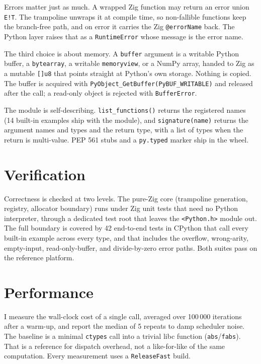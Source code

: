 \documentclass{jot}
\begin{document}
Errors matter just as much. A wrapped Zig function may return an error union \texttt{E!T}. The trampoline unwraps it at compile time, so non-fallible functions keep the branch-free path, and on error it carries the Zig \texttt{@errorName} back. The Python layer raises that as a \texttt{RuntimeError} whose message is the error name.

The third choice is about memory. A \texttt{buffer} argument is a writable Python buffer, a \texttt{bytearray}, a writable \texttt{memoryview}, or a NumPy array, handed to Zig as a mutable \texttt{[]u8} that points straight at Python's own storage. Nothing is copied. The buffer is acquired with \texttt{PyObject\_GetBuffer(PyBUF\_WRITABLE)} and released after the call; a read-only object is rejected with \texttt{BufferError}.

The module is self-describing. \texttt{list\_functions()} returns the registered names (14 built-in examples ship with the module), and \texttt{signature(name)} returns the argument names and types and the return type, with a list of types when the return is multi-value. PEP 561 stubs and a \texttt{py.typed} marker ship in the wheel.

\section{Verification}

Correctness is checked at two levels. The pure-Zig core (trampoline generation, registry, allocator boundary) runs under Zig unit tests that need no Python interpreter, through a dedicated test root that leaves the \texttt{<Python.h>} module out. The full boundary is covered by 42 end-to-end tests in CPython that call every built-in example across every type, and that includes the overflow, wrong-arity, empty-input, read-only-buffer, and divide-by-zero error paths. Both suites pass on the reference platform.

\section{Performance}

I measure the wall-clock cost of a single call, averaged over 100\,000 iterations after a warm-up, and report the median of 5 repeats to damp scheduler noise. The baseline is a minimal \texttt{ctypes} call into a trivial libc function (\texttt{abs}/\texttt{fabs}). That is a reference for dispatch overhead, not a like-for-like of the same computation. Every measurement uses a \texttt{ReleaseFast} build.
\end{document}
